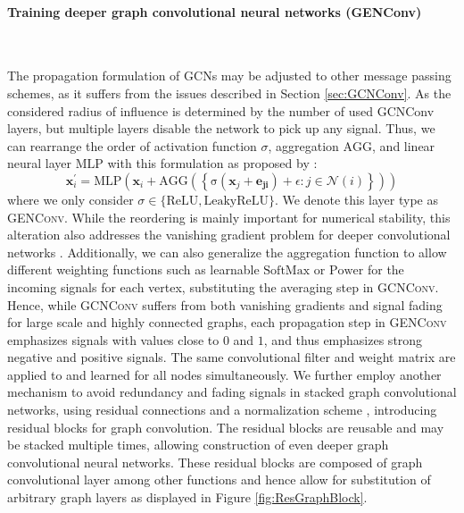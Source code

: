 \documentclass[]{article}
\renewcommand{\cite}{\citep}
\begin{document}
\paragraph{Training deeper graph convolutional neural networks (GENConv)}\mbox{}\\
\label{sec:GENConv}

The propagation formulation of GCNs may be adjusted to other message passing schemes, as it suffers from the issues described in Section \ref{sec:GCNConv}. As the considered radius of influence is determined by the number of used GCNConv layers, but multiple layers disable the network to pick up any signal. Thus, we
can rearrange the order of activation function $\sigma$, aggregation
$\mathrm{AGG}$, and linear neural layer $\mathrm{MLP}$ with this
formulation as proposed by \cite{GENConv2020}:
\begin{equation}
	\mathbf{x}_i^{\prime} = \mathrm{MLP} \left( \mathbf{x}_i +
	\mathrm{AGG} \left( \left\{
	\mathrm{\sigma} \left( \mathbf{x}_j + \mathbf{e_{ji}} \right) +\epsilon
	: j \in \mathcal{N}(i) \right\} \right)
	\right)
\end{equation}
where we only consider
$\sigma \in \{\mathrm{ReLU}, \mathrm{LeakyReLU}\}$. We denote this layer type as \textsc{GENConv}.  While the reordering is
mainly important for numerical stability, this alteration also addresses
the vanishing gradient problem for deeper convolutional networks
\cite{GENConv2020}. Additionally, we can also generalize the
aggregation function to allow different weighting functions such as
learnable $\mathrm{SoftMax}$ or $\mathrm{Power}$ for the incoming
signals for each vertex, substituting the averaging step in
\textsc{GCNConv}. Hence, while \textsc{GCNConv} suffers from both
vanishing gradients and signal fading for large scale and highly
connected graphs, each propagation step in \textsc{GENConv} emphasizes
signals with values close to $0$ and $1$, and thus emphasizes strong negative and positive signals. The same convolutional
filter and weight matrix are applied to and learned for all nodes
simultaneously. 
We further employ another mechanism to avoid redundancy and fading
signals in stacked graph convolutional networks, using residual
connections and a normalization scheme \cite{DeepGCN2019, GENConv2020}, introducing residual blocks for graph convolution. The residual
blocks are reusable and may be stacked multiple times, allowing construction of even deeper graph convolutional neural networks. These residual blocks are composed of graph convolutional layer among other functions and hence allow for substitution of arbitrary graph layers as displayed in Figure \ref{fig:ResGraphBlock}.\\
\end{document}
